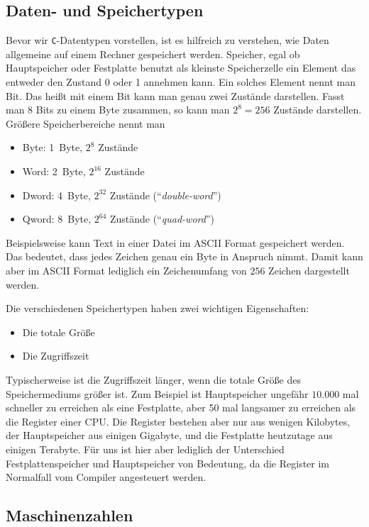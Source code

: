 \subsection{Daten- und Speichertypen}

Bevor wir \texttt{C}-Datentypen vorstellen, ist es hilfreich zu verstehen, wie Daten allgemeine auf einem Rechner gespeichert werden.
Speicher, egal ob Hauptspeicher oder Festplatte benutzt als kleinste Speicherzelle ein Element das entweder den Zustand 0 oder 1 annehmen kann.
Ein solches Element nennt man Bit.
Das heißt mit einem Bit kann man genau zwei Zustände darstellen.
Fasst man 8 Bits zu einem Byte zusammen, so kann man $2^8=256$ Zustände darstellen.
Größere Speicherbereiche nennt man
\begin{itemize}
\item Byte:  1~Byte, $2^{8 }$ Zustände
\item Word:  2~Byte, $2^{16}$ Zustände
\item Dword: 4~Byte, $2^{32}$ Zustände (\enquote{\emph{double-word}})
\item Qword: 8~Byte, $2^{64}$ Zustände (\enquote{\emph{quad-word}})
\end{itemize}
Beispielsweise kann Text in einer Datei im ASCII Format gespeichert werden. 
Das bedeutet, dass jedes Zeichen genau ein Byte in Anspruch nimmt.
Damit kann aber im ASCII Format lediglich ein Zeichenumfang von $256$ Zeichen dargestellt werden.

Die verschiedenen Speichertypen haben zwei wichtigen Eigenschaften:
\begin{itemize}
\item Die totale Größe
\item Die Zugriffszeit
\end{itemize}
Typischerweise ist die Zugriffszeit länger, wenn die totale Größe des Speichermediums größer ist.
Zum Beispiel ist Hauptspeicher ungefähr $10.000$ mal schneller zu erreichen als eine Festplatte, aber 50 mal langsamer zu erreichen als die Register einer CPU.
Die Register bestehen aber nur aus wenigen Kilobytes, der Hauptspeicher aus einigen Gigabyte, und die Festplatte heutzutage aus einigen Terabyte.
Für uns ist hier aber lediglich der Unterschied Festplattenspeicher und Hauptspeicher von Bedeutung, da die Register im Normalfall vom Compiler angesteuert werden.

\subsection{Maschinenzahlen}

